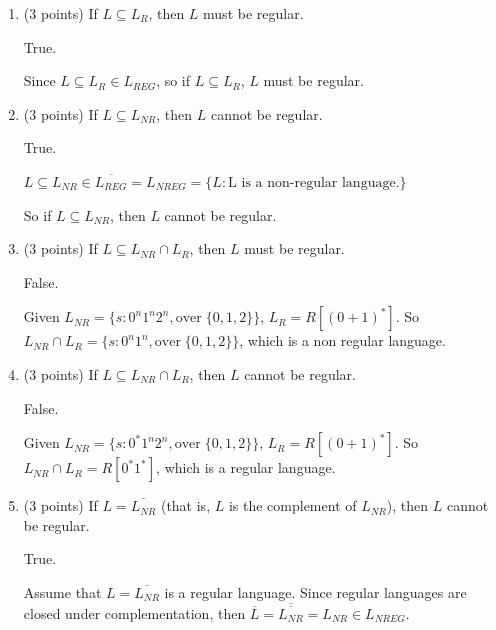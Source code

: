 \documentclass[paper=a4, fontsize=11pt]{scrartcl} %
\begin{document}
\begin{enumerate}
\item
  \begin{fancyquotes}
    (3 points) If $L \subseteq L_R$, then $L$ must be regular.
  \end{fancyquotes}

  True.

  Since $L \subseteq L_R \in L_{REG}$,
  so if $L\subseteq L_R$, $L$ must be regular.

\item
  \begin{fancyquotes}
    (3 points) If $L \subseteq L_{NR}$, then $L$ cannot be regular.
  \end{fancyquotes}

  True.

  $L \subseteq L_{NR} \in \overline{L_{REG}} = L_{NREG} =
  \{L: \text{L is a non-regular language.}\}$

  So if $L \subseteq L_{NR}$, then $L$ cannot be regular.

\item
  \begin{fancyquotes}
    (3 points) If $L \subseteq L_{NR} \cap L_R$, then $L$ must be regular.
  \end{fancyquotes}

  False.

  Given $L_{NR}=\{s: 0^n1^n2^n, \text{over}\;\{0,1,2\}\}$,
  $L_{R}=R[{(0+1)}^*]$. So $L_{NR}\cap L_R = \{s: 0^n1^n,
  \text{over}\;\{0,1,2\}\}$, which is a non regular language.

\item
  \begin{fancyquotes}
    (3 points) If $L \subseteq L_{NR} \cap L_R$, then $L$ cannot be regular.
  \end{fancyquotes}

  False.

  Given $L_{NR}=\{s: 0^*1^n2^n, \text{over}\;\{0,1,2\}\}$,
  $L_{R}=R[{(0+1)}^*]$. So $L_{NR}\cap L_R = R[0^*1^*]$, which is a
  regular language.

\item
  \begin{fancyquotes}
    (3 points) If $L = \overline{L_{NR}}$ (that is, $L$ is the complement of $L_{NR}$),
    then $L$ cannot be regular.
  \end{fancyquotes}

  True.

  Assume that $L = \overline{L_{NR}}$ is a regular language.
  Since regular languages are closed under complementation, then
  $\overline{L} = \overline{\overline{L_{NR}}} = L_{NR} \in L_{NREG}$.


\end{enumerate}
\end{document}
